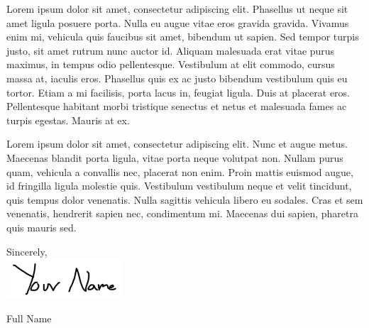 \documentclass{article}
\begin{document}
\vspace{.5em}

{\Large\noindent Lorem ipsum dolor sit amet, consectetur adipiscing elit. Phasellus ut neque sit amet ligula posuere porta. Nulla eu augue vitae eros gravida gravida. Vivamus enim mi, vehicula quis faucibus sit amet, bibendum ut sapien. Sed tempor turpis justo, sit amet rutrum nunc auctor id. Aliquam malesuada erat vitae purus maximus, in tempus odio pellentesque. Vestibulum at elit commodo, cursus massa at, iaculis eros. Phasellus quis ex ac justo bibendum vestibulum quis eu tortor. Etiam a mi facilisis, porta lacus in, feugiat ligula. Duis at placerat eros. Pellentesque habitant morbi tristique senectus et netus et malesuada fames ac turpis egestas. Mauris at ex.}

\vspace{.5em}

{\Large\noindent Lorem ipsum dolor sit amet, consectetur adipiscing elit. Nunc et augue metus. Maecenas blandit porta ligula, vitae porta neque volutpat non. Nullam purus quam, vehicula a convallis nec, placerat non enim. Proin mattis euismod augue, id fringilla ligula molestie quis. Vestibulum vestibulum neque et velit tincidunt, quis tempus dolor venenatis. Nulla sagittis vehicula libero eu sodales. Cras et sem venenatis, hendrerit sapien nec, condimentum mi. Maecenas dui sapien, pharetra quis mauris sed.}

\vspace{1em}

{\Large\noindent Sincerely,}
\\

\includegraphics[height=4em]{signature.png}

\vspace{1em}
{\Large\noindent Full Name}
\end{document}
